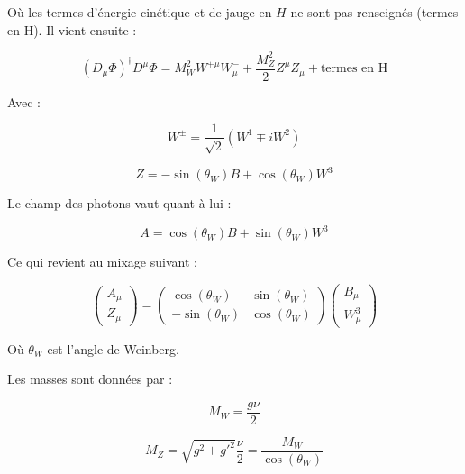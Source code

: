    
  O\`u les termes d'\'energie cin\'etique et de jauge en $H$ ne sont pas renseign\'es (termes en H). Il vient ensuite : 
  
  \begin{equation}
   ( D_{\mu} \Phi )^\dagger D^{\mu} \Phi = M_W^2 W^{+ \mu} W^-_{\mu} + \dfrac{M_Z^2}{2} Z^{\mu} Z_{\mu} + \text{termes en H}
  \end{equation}
  
  Avec : 
  
  \begin{equation}
   W^\pm = \dfrac{1}{\sqrt{2}} (W^1 \mp i W^2 )
  \end{equation}
  
  \begin{equation}
   Z = -\sin(\theta_W) B + \cos(\theta_W) W^3
  \end{equation}
  
  Le champ des photons vaut quant \`a lui :
  
  \begin{equation}
   A = \cos(\theta_W) B + \sin(\theta_W) W^3
  \end{equation}

  Ce qui revient au mixage suivant : 
  
  \begin{equation}
   \begin{pmatrix} A_{\mu} \\ Z_{\mu} \end{pmatrix} = \begin{pmatrix} \cos(\theta_W) & \sin(\theta_W) \\ -\sin(\theta_W) & \cos(\theta_W) \end{pmatrix} \begin{pmatrix} B_{\mu} \\ W_{\mu}^3 \end{pmatrix}
  \end{equation}

  O\`u $\theta_W$ est l'angle de Weinberg. 
  
  Les masses sont donn\'ees par : 
  
  \begin{equation}
   M_W = \dfrac{g \nu}{2}
  \label{eq:masseW}
  \end{equation}

  \begin{equation}
   M_Z = \sqrt{g^2+g'^2} \dfrac{\nu}{2} = \dfrac{M_W}{\cos(\theta_W)}
  \end{equation}

